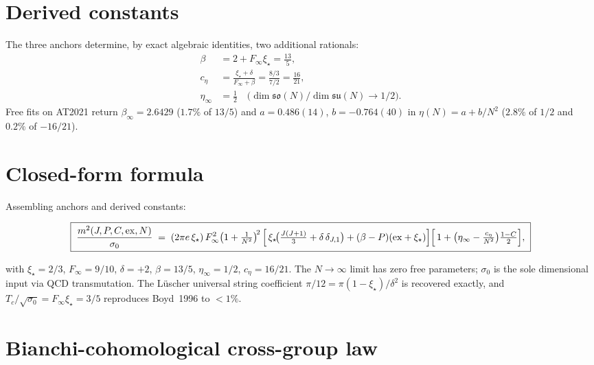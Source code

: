 \documentclass[aps,prl,reprint,superscriptaddress,floatfix,nofootinbib,amssymb]{revtex4-2}
\theoremstyle{definition}
\theoremstyle{remark}
\newcommand{\xistar}{\xi_{\star}}
\newcommand{\sigzero}{\sigma_0}
\newcommand{\Finf}{F_{\infty}}
\begin{document}
\section{Derived constants}\label{sec:derived}

The three anchors determine, by exact algebraic identities, two
additional rationals:
\begin{align}
\beta &= 2 + \Finf\xistar = \tfrac{13}{5}, \label{eq:beta-derived}\\
c_{\eta} &= \frac{\xistar+\delta}{\Finf+\beta}
            = \frac{8/3}{7/2} = \tfrac{16}{21}, \label{eq:c-eta-derived}\\
\eta_{\infty} &= \tfrac{1}{2}
                 \quad \text{(}\dim\mathfrak{so}(N)/\dim\mathfrak{su}(N)
                 \to 1/2\text{)}.
                 \label{eq:eta-inf}
\end{align}
Free fits on AT2021 return
$\beta_{\infty}=2.6429$ ($1.7\%$ of $13/5$) and
$a=0.486(14)$, $b=-0.764(40)$ in $\eta(N)=a+b/N^{2}$ ($2.8\%$ of
$1/2$ and $0.2\%$ of $-16/21$).

\section{Closed-form formula}\label{sec:closed-form}

Assembling anchors and derived constants:
\begin{widetext}
\begin{equation}
\boxed{\;
\frac{m^{2}(J,P,C,\mathrm{ex},N)}{\sigzero}
\;=\;
(2\pi e\,\xistar)\,\Finf^{2}\!\left(1+\tfrac{1}{N^{2}}\right)^{\!2}
\Bigl[\,\xistar\!\bigl(\tfrac{J(J+1)}{3}+\delta\,\delta_{J,1}\bigr)
+(\beta-P)(\mathrm{ex}+\xistar)\Bigr]
\Bigl[\,1+\bigl(\eta_{\infty}-\tfrac{c_{\eta}}{N^{2}}\bigr)\tfrac{1-C}{2}\Bigr],\;}
\label{eq:full-formula}
\end{equation}
\end{widetext}
with $\xistar=2/3$, $\Finf=9/10$, $\delta=+2$,
$\beta=13/5$, $\eta_{\infty}=1/2$, $c_{\eta}=16/21$.
The $N\to\infty$ limit has zero free parameters; $\sigzero$ is the
sole dimensional input via QCD transmutation. The L\"uscher universal
string coefficient $\pi/12 = \pi(1{-}\xistar)/\delta^{2}$ is recovered
exactly, and $T_c/\sqrt{\sigma_0}=\Finf\xistar=3/5$ reproduces
Boyd~1996 to $<1\%$.

\section{Bianchi-cohomological cross-group law}\label{sec:bianchi}
\end{document}

